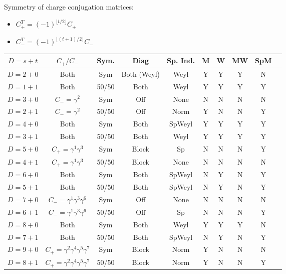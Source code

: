 \documentclass[11pt]{article}
\begin{document}
Symmetry of charge conjugation matrices:
\begin{itemize}
    \item $C_+^T = (-1)^{\lfloor t/2 \rfloor} C_+$
    \item $C_-^T = (-1)^{\lfloor (t + 1)/2 \rfloor} C_-$
\end{itemize}



\begin{table}[H]
    \centering
    \begin{tabular}{|c|c|c|c|c|c|c|c|c|c|}
        \hline
        $D = s + t$ & $C_+/C_-$ & Sym. & Diag & Sp. Ind. & M & W & MW & SpM\\
        \hline
        $D = 2 + 0$ & Both & Sym & Both (Weyl) & Weyl & Y & Y & Y & N\\
        $D = 1 + 1$ & Both & 50/50 & Both & Weyl & Y & Y & Y & Y\\
        $D = 3 + 0$ & $C_- = \gamma^2$ & Sym & Off & None & N & N & N & N\\
        $D = 2 + 1$ & $C_- = \gamma^2$ & 50/50 & Off & Norm & Y & N & N & Y\\
        $D = 4 + 0$ & Both & Sym & Both & SpWeyl & Y & Y & Y & Y\\
        $D = 3 + 1$ & Both & 50/50 & Both & Weyl & Y & Y & Y & Y\\
        $D = 5 + 0$ & $C_+ = \gamma^1 \gamma^3$ & Sym & Block & Sp & N & N & N & Y\\
        $D = 4 + 1$ & $C_+ = \gamma^1 \gamma^3$ & 50/50 & Block & None & N & N & N & N\\
        $D = 6 + 0$ & Both & Sym & Both & SpWeyl & N & Y & N & Y\\
        $D = 5 + 1$ & Both & 50/50 & Both & SpWeyl & N & Y & N & Y\\
        $D = 7 + 0$ & $C_- = \gamma^1 \gamma^3 \gamma^6$ & Sym & Off & None & N & N & N & N\\
        $D = 6 + 1$ & $C_- = \gamma^1 \gamma^3 \gamma^6$ & 50/50 & Off & Sp & N & N & N & Y\\
        $D = 8 + 0$ & Both & Sym & Both & Weyl & Y & Y & Y & N\\
        $D = 7 + 1$ & Both & 50/50 & Both & SpWeyl & N & Y & N & Y\\
        $D = 9 + 0$ & $C_+ = \gamma^2 \gamma^4 \gamma^5 \gamma^7$ & Sym & Block & Norm & Y & N & N & N\\
        $D = 8 + 1$ & $C_+ = \gamma^2 \gamma^4 \gamma^5 \gamma^7$ & 50/50 & Block & Norm & Y & N & N & Y\\

\end{tabular}
\end{table}
\end{document}
